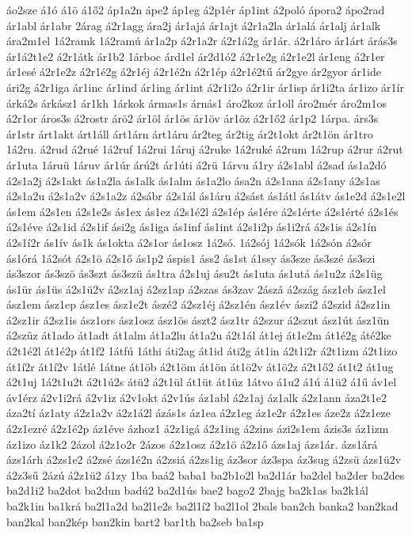 {áo2sze
á1ó
á1ö
á1ő2
áp1a2n
ápe2
áp1eg
á2p1ér
áp1int
á2poló
ápora2
ápo2rad
ár1abl
ár1abr
2árag
á2r1agg
ára2j
ár1ajá
ár1ajt
á2r1a2la
ár1alá
ár1alj
ár1alk
ára2m1el
1á2ramk
1á2ramú
ár1a2p
á2r1a2r
á2r1á2g
ár1ár.
á2r1áro
ár1árt
árás3s
ár1á2t1e2
á2r1átk
ár1b2
1árboc
árd1el
ár2d1ó2
á2r1e2g
á2r1e2l
ár1eng
á2r1er
ár1esé
á2r1e2z
á2r1é2g
á2r1éj
á2r1é2n
á2r1ép
á2r1é2tű
ár2gye
ár2gyor
ár1ide
ári2g
á2r1iga
ár1inc
ár1ind
ár1ing
ár1int
á2r1i2o
á2r1ir
ár1isp
ár1i2ta
ár1izo
ár1ír
árká2s
árkász1
ár1kh
1árkok
ármas1s
árnás1
áro2koz
ár1oll
áro2mér
áro2m1os
á2r1or
áros3s
á2rostr
árö2
ár1öl
ár1ös
ár1öv
ár1öz
á2r1ő2
ár1p2
1árpa.
árs3s
ár1str
árt1akt
árt1áll
árt1árn
árt1áru
ár2teg
ár2tig
ár2t1okt
ár2t1ön
ár1tro
1á2ru.
á2rud
á2rué
1á2ruf
1á2rui
1áruj
á2ruke
1á2ruké
á2rum
1á2rup
á2rur
á2rut
ár1uta
1áruü
1áruv
ár1úr
árú2t
ár1úti
á2rü
1árvu
á1ry
á2s1abl
á2sad
ás1a2dó
á2s1a2j
á2s1akt
ás1a2la
ás1alk
ás1alm
ás1a2lo
ása2n
á2s1ana
á2s1any
á2s1as
á2s1a2u
á2s1a2v
á2s1a2z
á2sábr
á2s1ál
ás1áru
á2sást
ás1átl
ás1átv
ás1e2d
á2s1e2l
ás1em
á2s1en
á2s1e2s
ás1ex
ás1ez
á2s1é2l
á2s1ép
ás1ére
á2s1érte
á2s1érté
á2s1és
á2s1éve
á2s1id
á2s1if
ási2g
ás1iga
ás1inf
ás1int
á2s1i2p
ás1i2rá
á2s1is
á2s1ín
á2s1í2r
ás1ív
ás1k
ás1okta
á2s1or
ás1osz
1á2só.
1á2sój
1á2sók
1á2són
á2sór
ás1órá
1á2sót
á2s1ö
á2s1ő
ás1p2
áspis1
áss2
ás1st
á1ssy
ás3sze
ás3szé
ás3szi
ás3szor
ás3szö
ás3szt
ás3szü
ás1tra
á2s1uj
ásu2t
ás1uta
ás1utá
ás1u2z
á2s1üg
ás1ür
ás1üs
á2s1ü2v
á2sz1aj
á2sz1ap
á2szas
ás3zav
2ászá
á2szág
ász1eb
ász1el
ász1em
ász1ep
ász1es
ász1e2t
ászé2
á2sz1éj
á2sz1én
ász1év
ászi2
á2szid
á2sz1in
á2sz1ir
á2sz1is
ász1ors
ász1osz
ász1ös
ászt2
ász1tr
á2szur
á2szut
ász1út
ász1ün
á2szüz
át1ado
át1adt
át1alm
át1a2lu
át1a2u
á2t1ál
át1ej
át1e2m
át1é2g
áté2ke
á2t1é2l
át1é2p
át1f2
1átfú
1áthi
áti2ag
át1id
áti2g
át1in
á2t1i2r
á2t1izm
á2t1izo
át1í2r
át1í2v
1átlé
1átne
át1öb
á2t1öm
át1ön
át1ö2v
át1ö2z
á2t1ő2
át1t2
át1ug
á2t1uj
1á2t1u2t
á2t1ú2s
átü2
á2t1ül
át1üt
át1üz
1átvo
á1u2
á1ú
á1ü2
á1ű
áv1el
áv1érz
á2v1i2rá
á2v1iz
á2v1okt
á2v1ús
áz1abl
á2z1aj
áz1alk
á2z1ann
áza2t1e2
áza2tí
áz1aty
á2z1a2v
á2z1á2l
ázás1s
áz1ea
á2z1eg
áz1e2r
á2z1es
áze2z
á2z1eze
á2z1ezré
á2z1é2p
áz1éve
ázhoz1
á2z1igá
á2z1ing
á2zins
ázi2s1em
ázis3s
áz1izm
áz1izo
áz1k2
2ázol
á2z1o2r
2ázos
á2z1osz
á2z1ö
á2z1ő
ázs1aj
ázs1ár.
ázs1árá
ázs1árh
á2zs1e2
á2zsé
ázs1é2n
á2zsiá
á2zs1ig
áz3sor
áz3spa
áz3sug
á2zsü
ázs1ü2v
á2z3sű
2ázú
á2z1ü2
á1zy
1ba
baá2
baba1
ba2b1o2l
ba2d1ár
ba2del
ba2der
ba2des
ba2d1i2
ba2dot
ba2dun
badú2
ba2d1ús
bae2
bago2
2bajg
ba2k1as
ba2k1ál
ba2k1in
ba1krá
ba2l1a2d
ba2l1e2s
ba2l1í2
ba2l1ol
2bals
ban2ch
banka2
ban2kad
ban2kal
ban2kép
ban2kin
bart2
bar1th
ba2seb
ba1sp
}
